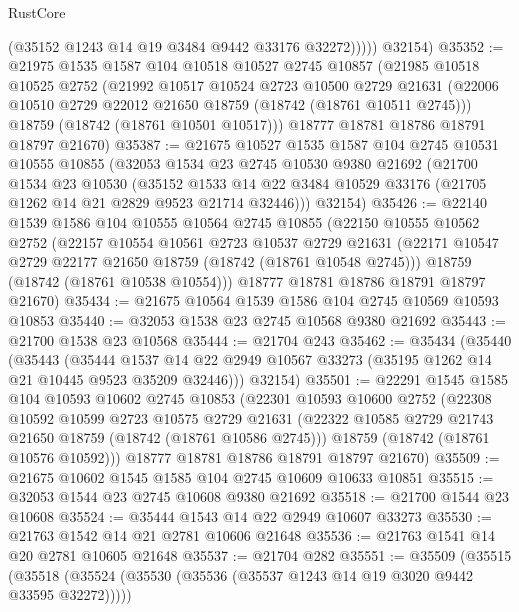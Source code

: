 \begin{lexlean}{RustCore}
\begin{coremodule}
              (@35152 @1243 @14 @19 @3484 @9442 @33176 @32272)))))
      @32154)
@35352 := @21975
    @1535
    @1587
    @104
    @10518
    @10527
    @2745
    @10857
    (@21985
      @10518
      @10525
      @2752
      (@21992
        @10517
        @10524
        @2723
        @10500
        @2729
        @21631
        (@22006 @10510 @2729 @22012 @21650 @18759 (@18742 (@18761 @10511 @2745)))
        @18759
        (@18742 (@18761 @10501 @10517)))
      @18777
      @18781
      @18786
      @18791
      @18797
      @21670)
@35387 := @21675
    @10527
    @1535
    @1587
    @104
    @2745
    @10531
    @10555
    @10855
    (@32053
      @1534
      @23
      @2745
      @10530
      @9380
      @21692
      (@21700
        @1534
        @23
        @10530
        (@35152 @1533 @14 @22 @3484 @10529 @33176 (@21705 @1262 @14 @21 @2829 @9523 @21714 @32446)))
      @32154)
@35426 := @22140
    @1539
    @1586
    @104
    @10555
    @10564
    @2745
    @10855
    (@22150
      @10555
      @10562
      @2752
      (@22157
        @10554
        @10561
        @2723
        @10537
        @2729
        @21631
        (@22171 @10547 @2729 @22177 @21650 @18759 (@18742 (@18761 @10548 @2745)))
        @18759
        (@18742 (@18761 @10538 @10554)))
      @18777
      @18781
      @18786
      @18791
      @18797
      @21670)
@35434 := @21675 @10564 @1539 @1586 @104 @2745 @10569 @10593 @10853
@35440 := @32053 @1538 @23 @2745 @10568 @9380 @21692
@35443 := @21700 @1538 @23 @10568
@35444 := @21704 @243
@35462 := @35434
    (@35440
      (@35443
        (@35444
          @1537
          @14
          @22
          @2949
          @10567
          @33273
          (@35195 @1262 @14 @21 @10445 @9523 @35209 @32446)))
      @32154)
@35501 := @22291
    @1545
    @1585
    @104
    @10593
    @10602
    @2745
    @10853
    (@22301
      @10593
      @10600
      @2752
      (@22308
        @10592
        @10599
        @2723
        @10575
        @2729
        @21631
        (@22322 @10585 @2729 @21743 @21650 @18759 (@18742 (@18761 @10586 @2745)))
        @18759
        (@18742 (@18761 @10576 @10592)))
      @18777
      @18781
      @18786
      @18791
      @18797
      @21670)
@35509 := @21675 @10602 @1545 @1585 @104 @2745 @10609 @10633 @10851
@35515 := @32053 @1544 @23 @2745 @10608 @9380 @21692
@35518 := @21700 @1544 @23 @10608
@35524 := @35444 @1543 @14 @22 @2949 @10607 @33273
@35530 := @21763 @1542 @14 @21 @2781 @10606 @21648
@35536 := @21763 @1541 @14 @20 @2781 @10605 @21648
@35537 := @21704 @282
@35551 := @35509
    (@35515
      (@35518 (@35524 (@35530 (@35536 (@35537 @1243 @14 @19 @3020 @9442 @33595 @32272)))))

\end{coremodule}
\end{lexlean}
